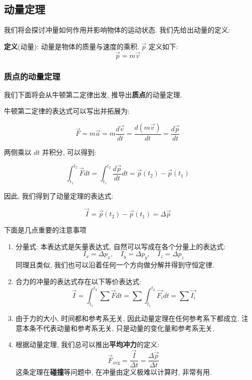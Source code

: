 \documentclass[
  a4paper,
]{ctexrep}
\providecommand{\tightlist}{%
  \setlength{\itemsep}{0pt}\setlength{\parskip}{0pt}}
\begin{document}
\subsection{动量定理}\label{ux52a8ux91cfux5b9aux7406}

我们将会探讨冲量如何作用并影响物体的运动状态. 我们先给出动量的定义:

\textbf{定义}(动量): 动量是物体的质量与速度的乘积. \(\vec{p}\) 定义如下:
\[
\vec{p} = m \vec{v}
\]

\subsubsection{质点的动量定理}\label{ux8d28ux70b9ux7684ux52a8ux91cfux5b9aux7406}

我们下面将会从牛顿第二定律出发, 推导出\textbf{质点}的动量定理.

牛顿第二定律的表达式可以写出并拓展为:

\[
\vec{F} = m \vec{a} = m \frac{d\vec{v}}{dt} = \frac{d(m\vec{v})}{dt} = \frac{d\vec{p}}{dt}
\]

两侧乘以 \(dt\) 并积分, 可以得到:

\[
\int_{t_1}^{t_2} \vec{F} dt = \int_{t_1}^{t_2} \frac{d\vec{p}}{dt} dt = \vec{p}(t_2) - \vec{p}(t_1)
\]

因此, 我们得到了动量定理的表达式:

\[
\vec{I} = \vec{p}(t_2) - \vec{p}(t_1) = \Delta \vec{p}
\]

下面是几点重要的注意事项

\begin{enumerate}
\def\labelenumi{\arabic{enumi}.}
\tightlist
\item
  分量式: 本表达式是矢量表达式, 自然可以写成在各个分量上的表达式: \[
   I_x = \Delta p_x, \quad I_y = \Delta p_y, \quad I_z = \Delta p_z
   \] 同理且类似, 我们也可以沿着任何一个方向做分解并得到守恒定律.
\item
  合力的冲量的表达式存在以下等价表达式: \[
  \vec{I} = \int_{t_1}^{t_2} \sum \vec{F} dt = \sum \int_{t_1}^{t_2} \vec{F_i} dt = \sum \vec{I_i}
  \]
\item
  由于力的大小, 时间都和参考系无关, 因此动量定理在任何参考系下都成立.
  注意本条不代表动量和参考系无关, 只是动量的变化量和参考系无关.
\item
  根据动量定理, 我们总可以推出\textbf{平均冲力}的定义: \[
  \vec{F}_{\text{avg}} = \frac{\vec{I}}{\Delta t} = \frac{\Delta \vec{p}}{\Delta t}
  \] 这条定理在\textbf{碰撞}等问题中, 在冲量由定义极难以计算时,
  非常有用.
\end{enumerate}
\end{document}
